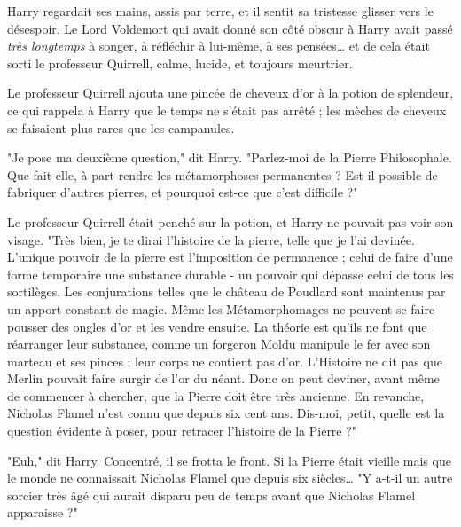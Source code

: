 Harry regardait ses mains, assis par terre, et il sentit sa tristesse glisser vers le désespoir. Le Lord Voldemort qui avait donné son côté obscur à Harry avait passé \emph{très longtemps}  à songer, à réfléchir à lui-même, à ses pensées… et de cela était sorti le professeur Quirrell, calme, lucide, et toujours meurtrier.

Le professeur Quirrell ajouta une pincée de cheveux d'or à la potion de splendeur, ce qui rappela à Harry que le temps ne s'était pas arrêté ; les mèches de cheveux se faisaient plus rares que les campanules.

"Je pose ma deuxième question," dit Harry. "Parlez-moi de la Pierre Philosophale. Que fait-elle, à part rendre les métamorphoses permanentes ? Est-il possible de fabriquer d'autres pierres, et pourquoi est-ce que c'est difficile ?"

Le professeur Quirrell était penché sur la potion, et Harry ne pouvait pas voir son visage. "Très bien, je te dirai l'histoire de la pierre, telle que je l'ai devinée. L'unique pouvoir de la pierre est l'imposition de permanence ; celui de faire d'une forme temporaire une substance durable - un pouvoir qui dépasse celui de tous les sortilèges. Les conjurations telles que le château de Poudlard sont maintenus par un apport constant de magie. Même les Métamorphomages ne peuvent se faire pousser des ongles d'or et les vendre ensuite. La théorie est qu'ils ne font que réarranger leur substance, comme un forgeron Moldu manipule le fer avec son marteau et ses pinces ; leur corps ne contient pas d'or. L'Histoire ne dit pas que Merlin pouvait faire surgir de l'or du néant. Donc on peut deviner, avant même de commencer à chercher, que la Pierre doit être très ancienne. En revanche, Nicholas Flamel n'est connu que depuis six cent ans. Dis-moi, petit, quelle est la question évidente à poser, pour retracer l'histoire de la Pierre ?"

"Euh," dit Harry. Concentré, il se frotta le front. Si la Pierre était vieille mais que le monde ne connaissait Nicholas Flamel que depuis six siècles… "Y a-t-il un autre sorcier très âgé qui aurait disparu peu de temps avant que Nicholas Flamel apparaisse ?"

